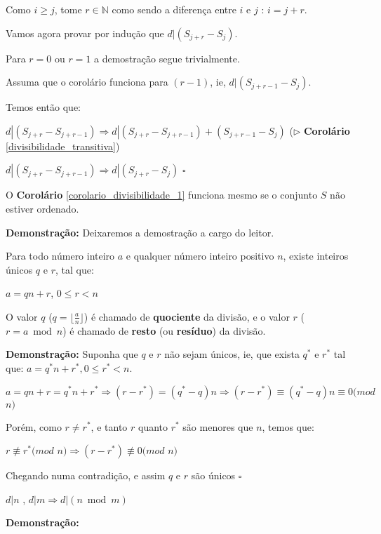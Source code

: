 Como $i \geq j$, tome $r \in \mathbb{N}$ como sendo a diferença entre $i$ e $j$ : $i = j + r$.

Vamos agora provar por indução que $d|(S_{j+r}-S_j)$.

Para $r=0$ ou $r=1$ a demostração segue trivialmente.

Assuma que o corolário funciona para $(r-1)$, ie, $d|(S_{j+r-1}-S_j)$. 

Temos então que: 

$d|(S_{j+r}-S_{j+r-1}) \Rightarrow d|(S_{j+r}-S_{j+r-1})+(S_{j+r-1}-S_j)$ ($\triangleright$ \textbf{Corolário} \autoref{divisibilidade_transitiva})

$d|(S_{j+r}-S_{j+r-1}) \Rightarrow d|(S_{j+r}-S_j)$ $\square$ 


\begin{corollary}
O \textbf{Corolário} \autoref{corolario_divisibilidade_1} funciona mesmo se o conjunto $S$ não estiver ordenado.
\end{corollary}
\textbf{Demonstração:}
Deixaremos a demostração a cargo do leitor.


\begin{theorem}\label{algoritmo_divisao}
Para todo número inteiro $a$ e qualquer número inteiro positivo $n$, existe inteiros únicos $q$ e $r$, tal que:

$a = qn + r$, $0 \leq r < n$

O valor $q$ ($q = \lfloor  \frac{a}{n} \rfloor$) é chamado de \textbf{quociente} da divisão, e o valor $r$ ($r = a \bmod n$) é chamado de \textbf{resto}
(ou \textbf{resíduo}) da divisão.
\end{theorem}
\textbf{Demonstração:}
Suponha que $q$ e $r$ não sejam únicos, ie, que exista $q^*$ e $r^*$ tal que: $a = q^*n + r^*, 0 \leq r^* < n$.

$a = qn + r = q^*n + r^* \Rightarrow (r - r^*) = (q^* - q)n \Rightarrow (r - r^*) \equiv (q^* - q)n \equiv 0 (mod$ $n)$

Porém, como $r \neq r^*$, e tanto $r$ quanto $r^*$ são menores que $n$, temos que: 

$r \not\equiv r^* (mod$ $n) \Rightarrow (r - r^*) \not\equiv 0 (mod$ $n)$

Chegando numa contradição, e assim $q$ e $r$ são únicos $\square$ \\

\begin{corollary}\label{divisibilidade_modular}
$d|n$ , $d|m \Rightarrow d|(n \bmod m)$
\end{corollary}
\textbf{Demonstração:}

